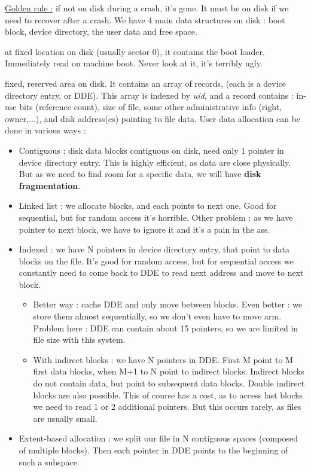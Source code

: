 \documentclass[12pt,a4paper]{article}
\begin{document}
\uline{Golden rule :} if not on disk during a crash, it's gone. It must be on disk if we need to recover after a crash. We have 4 main data structures on disk : boot block, device directory, the user data and free space. 

 at fixed location on disk (usually sector 0), it contains the boot loader. Immediately read on machine boot. Never look at it, it's terribly ugly. 

 fixed, reserved area on disk. It contains an array of records, (each is a device directory entry, or DDE). This array is indexed by \textit{uid}, and a record contains : in-use bits (reference count), size of file, some other administrative info (right, owner,...), and disk address(es) pointing to file data. User data allocation can be done in various ways :
\begin{itemize}
	\item Contiguous : disk data blocks contiguous on disk, need only 1 pointer in device directory entry. This is highly efficient, as data are close physically. But as we need to find room for a specific data, we will have \textbf{disk fragmentation}. 
	\item Linked list : we allocate blocks, and each points to next one. Good for sequential, but for random access it's horrible. Other problem : as we have pointer to next block, we have to ignore it and it's a pain in the ass. 
	\item Indexed : we have N pointers in device directory entry, that point to data blocks on the file. It's good for random access, but for sequential access we constantly need to come back to DDE to read next address and move to next block.  
	\begin{itemize}
		\item Better way : cache DDE and only move between blocks. Even better : we store them almost sequentially, so we don't even have to move arm. Problem here : DDE can contain about 15 pointers, so we are limited in file size with this system.
		\item With indirect blocks : we have N pointers in DDE. First M point to M first data blocks, when M+1 to N point to indirect blocks. Indirect blocks do not contain data, but point to subsequent data blocks.  Double indirect blocks are also possible. This of course has a cost, as to access last blocks we need to read 1 or 2 additional pointers. But this occurs rarely, as files are usually small. 
	\end{itemize}
	\item Extent-based allocation : we split our file in N contiguous spaces (composed of multiple blocks). Then each pointer in DDE points to the beginning of such a subspace. 
\end{itemize}
\end{document}
